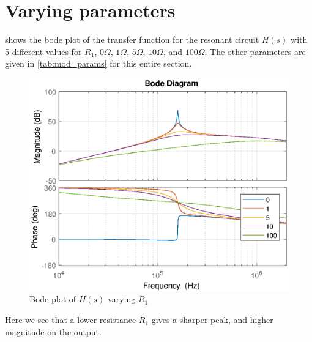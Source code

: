 \newpage
\section{Varying parameters}

 shows the bode plot of the transfer function for the resonant circuit $H(s)$ with 5 different values for $R_1$, $0\Omega$, $1\Omega$, $5\Omega$, $10\Omega$, and $100\Omega$. The other parameters are given in \cref{tab:mod_params} for this entire section.

\begin{figure}[H]
    \centering
    \includegraphics[width=\textwidth]{img/CoilRigBode_R1.eps}
    \caption{Bode plot of $H(s)$ varying $R_1$}
    \label{fig:bode_r1}
\end{figure}

Here we see that a lower resistance $R_1$ gives a sharper peak, and higher magnitude on the output.


